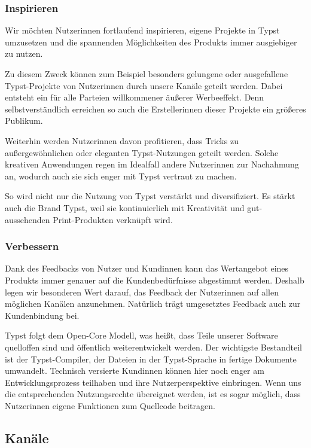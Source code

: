 \documentclass[11pt, a4paper]{article}
\newcommand{\gender}{\raisebox{-.25em}{*}}
\renewcommand{\glossary} {\marginsymbol{$\hookrightarrow$}}
\newcommand{\marginsymbol}[1] {\protect\marginsymbolhelper{#1}}
\newcommand{\marginsymbolhelper}[1] {\tabto*{-1cm}\makebox[0cm]{#1}\tabto*{\TabPrevPos}}
\begin{document}
\subsubsection*{Inspirieren}

Wir möchten Nutzer\gender{}innen fortlaufend inspirieren, eigene Projekte in Typst umzusetzen und die spannenden Möglichkeiten des Produkts immer ausgiebiger zu nutzen.

Zu diesem Zweck können zum Beispiel besonders gelungene oder ausgefallene Typst-Projekte von Nutzer\gender{}innen durch unsere Kanäle geteilt werden. Dabei entsteht ein für alle Parteien willkommener äußerer Werbeeffekt. Denn selbstverständlich erreichen so auch die Ersteller\gender{}innen dieser Projekte ein größeres Publikum.

Weiterhin werden Nutzer\gender{}innen davon profitieren, dass Tricks zu außergewöhnlichen oder eleganten Typst-Nutzungen geteilt werden. Solche kreativen Anwendungen regen im Idealfall andere Nutzer\gender{}innen zur Nachahmung an, wodurch auch sie sich enger mit Typst vertraut zu machen.

So wird nicht nur die Nutzung von Typst verstärkt und diversifiziert. Es stärkt auch die Brand Typst, weil sie kontinuierlich mit Kreativität und gut-aussehenden Print-Produkten verknüpft wird.

\subsubsection*{Verbessern}

Dank des Feedbacks von Nutzer\gender{} und Kund\gender{}innen kann das Wertangebot eines Produkts immer genauer auf die Kundenbedürfnisse abgestimmt werden. Deshalb legen wir besonderen Wert darauf, das Feedback der Nutzer\gender{}innen auf allen möglichen Kanälen anzunehmen. Natürlich trägt umgesetztes Feedback auch zur Kundenbindung bei.

Typst folgt dem Open-Core Modell, was heißt, dass Teile unserer Software quelloffen sind und öffentlich weiterentwickelt werden. Der wichtigste Bestandteil ist der \glossary Typst-Compiler, der Dateien in der Typst-Sprache in fertige Dokumente umwandelt. Technisch versierte Kund\gender{}innen können hier noch enger am Entwicklungsprozess teilhaben und ihre Nutzerperspektive einbringen. Wenn uns die entsprechenden Nutzungsrechte übereignet werden, ist es sogar möglich, dass Nutzer\gender{}innen eigene Funktionen zum Quellcode beitragen.


\newpage
\subsection*{Kanäle}
\end{document}
